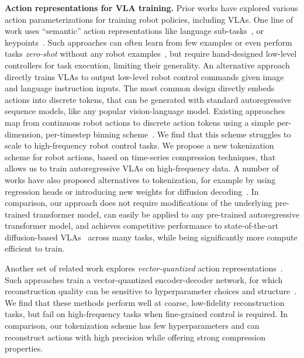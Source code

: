 \noindent\textbf{Action representations for VLA training.}
Prior works have explored various action parameterizations for training robot policies, including VLAs.
One line of work uses ``semantic'' action representations like language sub-tasks~\citep{driess2023palm,saycan2022arxiv,belkhale2024rthactionhierarchiesusing}, 
or keypoints~\citep{nasirianypivot,huang2024rekep,fangandliu2024moka,dipalo2024kat}. 
Such approaches can often learn from few examples or even perform tasks \emph{zero-shot} without any robot examples~\citep{nasirianypivot,huang2024rekep,fangandliu2024moka}, but require hand-designed low-level controllers for task execution, limiting their generality. An alternative approach directly trains VLAs to output low-level robot control commands given image and language instruction inputs. The most common design directly embeds actions into discrete tokens, that can be generated with standard autoregressive sequence models, like any popular vision-language model. Existing approaches map from continuous robot actions to discrete action tokens using a simple per-dimension, per-timestep binning scheme~\citep{brohan2022rt,rt22023arxiv,kim2024openvla}.
We find that this scheme struggles to scale to high-frequency robot control tasks. We propose a new tokenization scheme for robot actions, based on time-series compression techniques, that allows us to train autoregressive VLAs on high-frequency data. A number of works have also proposed alternatives to tokenization, for example by using regression heads or introducing new weights for diffusion decoding~\citep{Doshi24-crossformer,black2024pi_0,lee2024behavior,wen2024tinyvlafastdataefficientvisionlanguageaction}. In comparison, our approach does not require modifications of the underlying pre-trained transformer model, can easily be applied to any pre-trained autoregressive transformer model, and achieves competitive performance to state-of-the-art diffusion-based VLAs~\citep{black2024pi_0} across many tasks, while being significantly more compute efficient to train. 

Another set of related work explores \textit{vector-quantized} action representations~\citep{lee2024behavior, belkhale2024minivla, mete2024questselfsupervisedskillabstractions}. Such approaches train a vector-quantized encoder-decoder network, for which reconstruction quality can be sensitive to hyperparameter choices and structure~\cite{yu2023magvit}. We find that these methods perform well at coarse, low-fidelity reconstruction tasks, but fail on high-frequency tasks when fine-grained control is required. In comparison, our {\ModelAcronym} tokenization scheme has few hyperparameters and can reconstruct actions with high precision while offering strong compression properties.



